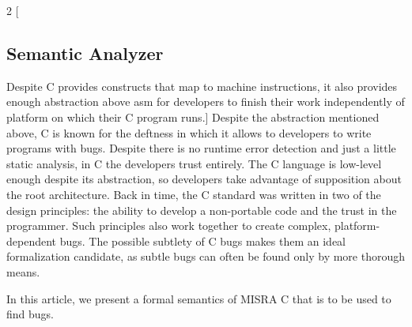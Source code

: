 \begin{minipage}{\linewidth}
	\begin{multicols*}{2}
		[
		\vspace{6 mm}
		\subsection{Semantic Analyzer}
		Despite C provides constructs that map to machine instructions, it also provides enough abstraction above \gls{asm} for developers to finish their work independently of platform  on which their C program runs.]
		Despite the abstraction mentioned above, C is known for the deftness in which it allows to developers to write programs with bugs. Despite there is no runtime error detection and just a little static analysis, in C the developers trust entirely. The C language is low-level enough despite its abstraction, so developers take advantage of supposition about the root architecture.  
		Back in time, the C standard was written in two of the design principles: the ability to develop a non-portable code and the trust in the programmer\cite{AmericanNationalStandardsInstitute:1990:RAC:533966}. Such principles also work together to create complex, platform-dependent bugs. The possible subtlety of C bugs makes them an ideal formalization candidate, as subtle bugs can often be found only by more thorough means.
		
		In this article, we present a formal semantics of MISRA C that is to be used to find bugs. 
	\end{multicols*}
\end{minipage}

